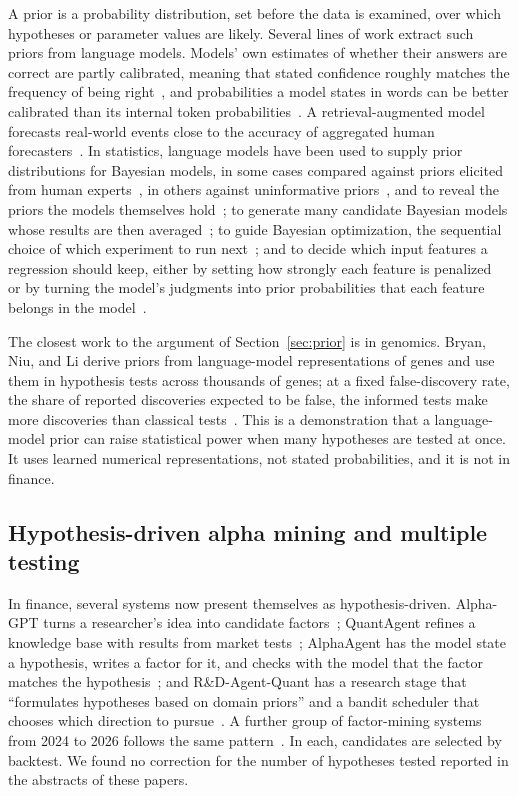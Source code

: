 \documentclass[11pt]{article}
\begin{document}
A prior is a probability distribution, set before the data is examined, over which hypotheses or
parameter values are likely. Several lines of work extract such priors from language models. Models'
own estimates of whether their answers are correct are partly calibrated, meaning that stated confidence
roughly matches the frequency of being right~\cite{kadavath}, and probabilities a model states in words
can be better calibrated than its internal token probabilities~\cite{tian2023}. A retrieval-augmented
model forecasts real-world events close to the accuracy of aggregated human forecasters~\cite{halawi}.
In statistics, language models have been used to supply prior distributions for Bayesian models, in
some cases compared against priors elicited from human experts~\cite{selby}, in others against
uninformative priors~\cite{autoelicit}, and to reveal the priors the models themselves hold~\cite{zhugriffiths}; to generate many candidate Bayesian models
whose results are then averaged~\cite{llbayes}; to guide Bayesian optimization, the sequential choice of
which experiment to run next~\cite{llambo}; and to decide which input features a regression should
keep, either by setting how strongly each feature is penalized~\cite{llmlasso} or by turning the model's
judgments into prior probabilities that each feature belongs in the model~\cite{sparsityprior}.

The closest work to the argument of Section~\ref{sec:prior} is in genomics. Bryan, Niu, and Li derive
priors from language-model representations of genes and use them in hypothesis tests across thousands of
genes; at a fixed false-discovery rate, the share of reported discoveries expected to be false, the
informed tests make more discoveries than classical tests~\cite{bryan}. This is a demonstration that a
language-model prior can raise statistical power when many hypotheses are tested at once. It uses
learned numerical representations, not stated probabilities, and it is not in finance.

\subsection{Hypothesis-driven alpha mining and multiple testing}

In finance, several systems now present themselves as hypothesis-driven. Alpha-GPT turns a
researcher's idea into candidate factors~\cite{alphagpt}; QuantAgent refines a knowledge base with
results from market tests~\cite{quantagent}; AlphaAgent has the model state a hypothesis, writes a
factor for it, and checks with the model that the factor matches the hypothesis~\cite{alphaagent}; and
R\&D-Agent-Quant has a research stage that ``formulates hypotheses based on domain priors'' and a bandit
scheduler that chooses which direction to pursue~\cite{rdagent}. A further group of factor-mining
systems from 2024 to 2026 follows the same pattern~\cite{automate,quantaalpha,alphajungle}. In each,
candidates are selected by backtest. We found no correction for the number of hypotheses tested reported
in the abstracts of these papers.
\end{document}
